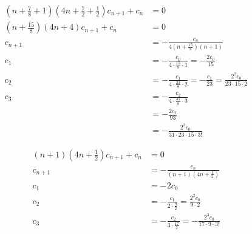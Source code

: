 \documentclass{article}
\begin{document}
\begin{align*}
  \left( n + \frac{7}{8} + 1 \right) \left( 4 n + \frac{7}{2} + \frac{1}{2} \right) c_{n + 1} + c_n & = 0                                                                                                 \\
  \left( n + \frac{15}{8} \right) \left( 4 n + 4 \right) c_{n + 1} + c_n                            & = 0                                                                                                 \\
  c_{n + 1}                                                                                         & = -\frac{c_n}{4 \left( n + \frac{15}{8} \right) (n + 1)}                                            \\
  c_1                                                                                               & = -\frac{c_0}{4 \cdot \frac{15}{8} \cdot 1} = -\frac{2 c_0}{15}                                     \\
  c_2                                                                                               & = -\frac{c_1}{4 \cdot \frac{23}{8} \cdot 2} = -\frac{c_1}{23} = \frac{2^2 c_0}{23 \cdot 15 \cdot 2} \\
  c_3                                                                                               & = -\frac{c_2}{4 \cdot \frac{31}{8} \cdot 3}                                                         \\
                                                                                                    & = -\frac{2 c_2}{93}                                                                                 \\
                                                                                                    & = -\frac{2^3 c_0}{31 \cdot 23 \cdot 15 \cdot 3!}
\end{align*}


\begin{align*}
  (n + 1) \left( 4 n + \frac{1}{2} \right) c_{n + 1} + c_n & = 0                                                                        \\
  c_{n + 1}                                                & = -\frac{c_n}{(n + 1) \left( 4 n + \frac{1}{2} \right)}                    \\
  c_1                                                      & = -2 c_0                                                                   \\
  c_2                                                      & = -\frac{c_1}{2 \cdot \frac{9}{2}} = \frac{2^2 c_0}{9 \cdot 2}             \\
  c_3                                                      & = -\frac{c_2}{3 \cdot \frac{17}{2}} = -\frac{2^3 c_0}{17 \cdot 9 \cdot 3!}
\end{align*}
\end{document}
